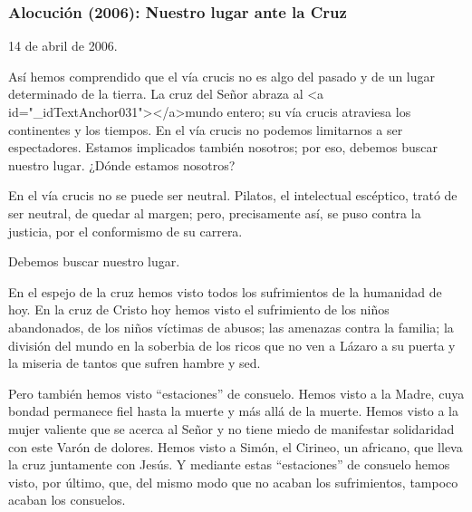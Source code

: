 			\subsubsection{Alocución (2006): Nuestro lugar ante la Cruz}
			
			\begin{referencia}14 de abril de 2006.\end{referencia}
			
			\begin{body}\begin{bodysmall}\end{bodysmall}\end{body}
			
			\begin{body}Así hemos comprendido que el vía crucis no es algo del pasado y de un lugar determinado de la tierra. La cruz del Señor abraza al <a id="_idTextAnchor031"></a>mundo entero; su vía crucis atraviesa los continentes y los tiempos. En el vía crucis no podemos limitarnos a ser espectadores. Estamos implicados también nosotros; por eso, debemos buscar nuestro lugar. ¿Dónde estamos nosotros? \end{body}
			
			\begin{body}En el vía crucis no se puede ser neutral. Pilatos, el intelectual escéptico, trató de ser neutral, de quedar al margen; pero, precisamente así, se puso contra la justicia, por el conformismo de su carrera. \end{body}
			
			\begin{body}Debemos buscar nuestro lugar.\end{body}
			
			\begin{body} En el espejo de la cruz hemos visto todos los sufrimientos de la humanidad de hoy. En la cruz de Cristo hoy hemos visto el sufrimiento de los niños abandonados, de los niños víctimas de abusos; las amenazas contra la familia; la división del mundo en la soberbia de los ricos que no ven a Lázaro a su puerta y la miseria de tantos que sufren hambre y sed. \end{body}
			
			\begin{body}Pero también hemos visto “estaciones” de consuelo. Hemos visto a la Madre, cuya bondad permanece fiel hasta la muerte y más allá de la muerte. Hemos visto a la mujer valiente que se acerca al Señor y no tiene miedo de manifestar solidaridad con este Varón de dolores. Hemos visto a Simón, el Cirineo, un africano, que lleva la cruz juntamente con Jesús. Y mediante estas “estaciones” de consuelo hemos visto, por último, que, del mismo modo que no acaban los sufrimientos, tampoco acaban los consuelos. \end{body}
			
